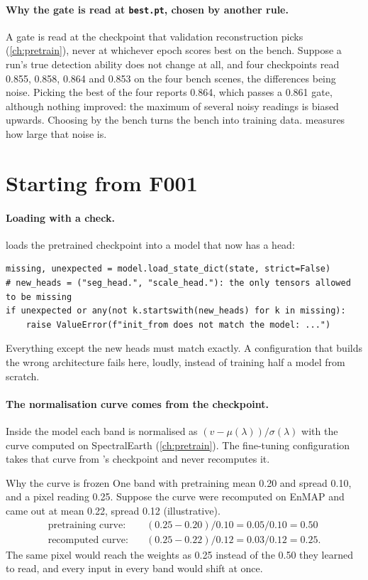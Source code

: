 \paragraph{Why the gate is read at \texttt{best.pt}, chosen by another rule.} A gate is read at the checkpoint that validation reconstruction picks
(\cref{ch:pretrain}), never at whichever epoch scores best on the bench. Suppose a run's true detection ability does not change at all, and four
checkpoints read 0.855, 0.858, 0.864 and 0.853 on the four bench scenes, the differences being noise\tbrk\tagA. Picking the best of the four reports 0.864,
which passes a 0.861 gate, although nothing improved: the maximum of several noisy readings is biased upwards. Choosing by the bench turns the bench
into training data.  measures how large that noise is.

\section{Starting from F001}\label{sec:finetune:init}

\paragraph{Loading with a check.}  loads the pretrained checkpoint into a model that now has a head:
\begin{lstlisting}
missing, unexpected = model.load_state_dict(state, strict=False)
# new_heads = ("seg_head.", "scale_head."): the only tensors allowed to be missing
if unexpected or any(not k.startswith(new_heads) for k in missing):
    raise ValueError(f"init_from does not match the model: ...")
\end{lstlisting}
Everything except the new heads must match exactly. A configuration that builds the wrong architecture fails here, loudly, instead of training half
a model from scratch.

\paragraph{The normalisation curve comes from the checkpoint.} Inside the model each band is normalised as $(v - \mu(\lambda))/\sigma(\lambda)$ with the
curve computed on SpectralEarth (\cref{ch:pretrain}). The fine-tuning configuration takes that curve from 's checkpoint and never
recomputes it.

\begin{worked}[label={we:finetune:curve}]{Why the curve is frozen}
One band with pretraining mean 0.20 and spread 0.10, and a pixel reading 0.25. Suppose the curve were recomputed on EnMAP and came out at mean 0.22,
spread 0.12 (illustrative\tbrk\tagA).
\begin{align*}
  \text{pretraining curve:}&\quad (0.25 - 0.20)/0.10 = 0.05 / 0.10 = 0.50\\
  \text{recomputed curve:}&\quad (0.25 - 0.22)/0.12 = 0.03 / 0.12 = 0.25.
\end{align*}
The same pixel would reach the weights as 0.25 instead of the 0.50 they learned to read, and every input in every band would shift at once.
\end{worked}

